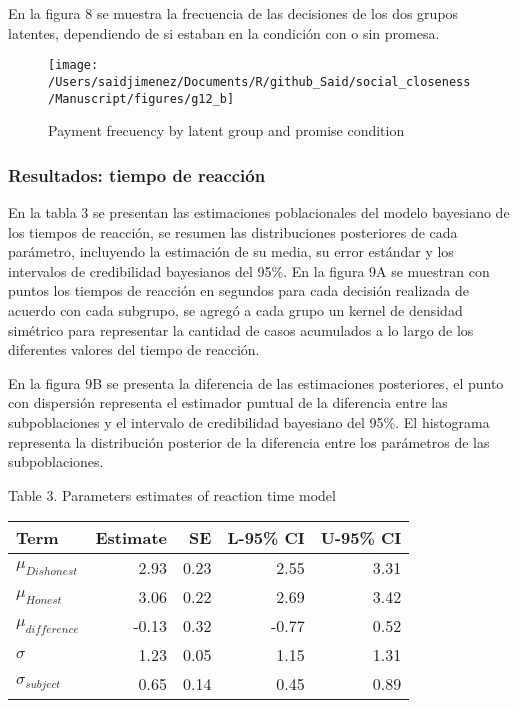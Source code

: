 \documentclass[]{article}
\begin{document}
En la figura 8 se muestra la frecuencia de las decisiones de los dos
grupos latentes, dependiendo de si estaban en la condición con o sin
promesa.

\begin{figure}

{\centering \texttt{[image: /Users/saidjimenez/Documents/R/github\_Said/social\_closeness/Manuscript/figures/g12\_b]} 

}

\caption{Payment frecuency by latent group and promise condition}\label{fig:fig8}
\end{figure}

\subsubsection{Resultados: tiempo de
reacción}\label{resultados-tiempo-de-reaccion}

En la tabla 3 se presentan las estimaciones poblacionales del modelo
bayesiano de los tiempos de reacción, se resumen las distribuciones
posteriores de cada parámetro, incluyendo la estimación de su media, su
error estándar y los intervalos de credibilidad bayesianos del 95\%. En
la figura 9A se muestran con puntos los tiempos de reacción en segundos
para cada decisión realizada de acuerdo con cada subgrupo, se agregó a
cada grupo un kernel de densidad simétrico para representar la cantidad
de casos acumulados a lo largo de los diferentes valores del tiempo de
reacción.

En la figura 9B se presenta la diferencia de las estimaciones
posteriores, el punto con dispersión representa el estimador puntual de
la diferencia entre las subpoblaciones y el intervalo de credibilidad
bayesiano del 95\%. El histograma representa la distribución posterior
de la diferencia entre los parámetros de las subpoblaciones.

Table 3. Parameters estimates of reaction time model

\begin{longtable}[]{@{}lrrrr@{}}
\toprule
Term & Estimate & SE & L-95\% CI & U-95\% CI\tabularnewline
\midrule
\endhead
\(\mu_{Dishonest}\) & 2.93 & 0.23 & 2.55 & 3.31\tabularnewline
\(\mu_{Honest}\) & 3.06 & 0.22 & 2.69 & 3.42\tabularnewline
\(\mu_{difference}\) & -0.13 & 0.32 & -0.77 & 0.52\tabularnewline
\(\sigma\) & 1.23 & 0.05 & 1.15 & 1.31\tabularnewline
\(\sigma_{subject}\) & 0.65 & 0.14 & 0.45 & 0.89\tabularnewline
\bottomrule
\end{longtable}
\end{document}
